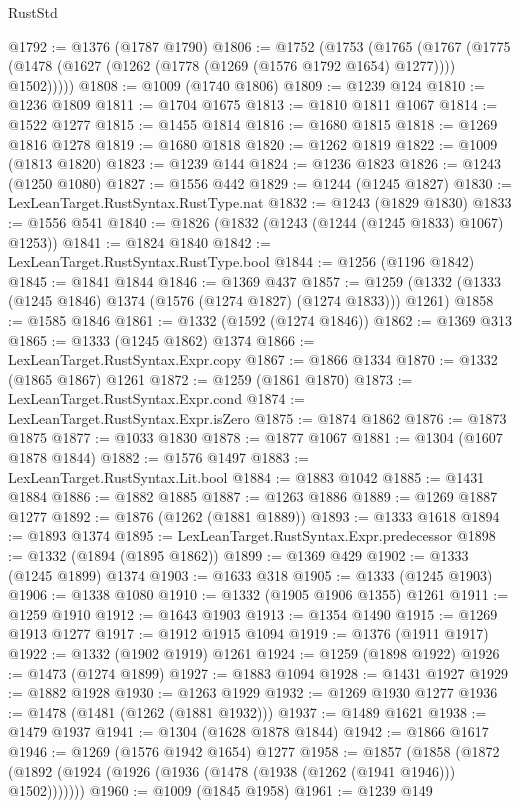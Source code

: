\begin{lexlean}{RustStd}
\begin{coremodule}
@1792 := @1376 (@1787 @1790)
@1806 := @1752
    (@1753
      (@1765
        (@1767 (@1775 (@1478 (@1627 (@1262 (@1778 (@1269 (@1576 @1792 @1654) @1277)))) @1502)))))
@1808 := @1009 (@1740 @1806)
@1809 := @1239 @124
@1810 := @1236 @1809
@1811 := @1704 @1675
@1813 := @1810 @1811 @1067
@1814 := @1522 @1277
@1815 := @1455 @1814
@1816 := @1680 @1815
@1818 := @1269 @1816 @1278
@1819 := @1680 @1818
@1820 := @1262 @1819
@1822 := @1009 (@1813 @1820)
@1823 := @1239 @144
@1824 := @1236 @1823
@1826 := @1243 (@1250 @1080)
@1827 := @1556 @442
@1829 := @1244 (@1245 @1827)
@1830 := LexLeanTarget.RustSyntax.RustType.nat
@1832 := @1243 (@1829 @1830)
@1833 := @1556 @541
@1840 := @1826 (@1832 (@1243 (@1244 (@1245 @1833) @1067) @1253))
@1841 := @1824 @1840
@1842 := LexLeanTarget.RustSyntax.RustType.bool
@1844 := @1256 (@1196 @1842)
@1845 := @1841 @1844
@1846 := @1369 @437
@1857 := @1259 (@1332 (@1333 (@1245 @1846) @1374 (@1576 (@1274 @1827) (@1274 @1833))) @1261)
@1858 := @1585 @1846
@1861 := @1332 (@1592 (@1274 @1846))
@1862 := @1369 @313
@1865 := @1333 (@1245 @1862) @1374
@1866 := LexLeanTarget.RustSyntax.Expr.copy
@1867 := @1866 @1334
@1870 := @1332 (@1865 @1867) @1261
@1872 := @1259 (@1861 @1870)
@1873 := LexLeanTarget.RustSyntax.Expr.cond
@1874 := LexLeanTarget.RustSyntax.Expr.isZero
@1875 := @1874 @1862
@1876 := @1873 @1875
@1877 := @1033 @1830
@1878 := @1877 @1067
@1881 := @1304 (@1607 @1878 @1844)
@1882 := @1576 @1497
@1883 := LexLeanTarget.RustSyntax.Lit.bool
@1884 := @1883 @1042
@1885 := @1431 @1884
@1886 := @1882 @1885
@1887 := @1263 @1886
@1889 := @1269 @1887 @1277
@1892 := @1876 (@1262 (@1881 @1889))
@1893 := @1333 @1618
@1894 := @1893 @1374
@1895 := LexLeanTarget.RustSyntax.Expr.predecessor
@1898 := @1332 (@1894 (@1895 @1862))
@1899 := @1369 @429
@1902 := @1333 (@1245 @1899) @1374
@1903 := @1633 @318
@1905 := @1333 (@1245 @1903)
@1906 := @1338 @1080
@1910 := @1332 (@1905 @1906 @1355) @1261
@1911 := @1259 @1910
@1912 := @1643 @1903
@1913 := @1354 @1490
@1915 := @1269 @1913 @1277
@1917 := @1912 @1915 @1094
@1919 := @1376 (@1911 @1917)
@1922 := @1332 (@1902 @1919) @1261
@1924 := @1259 (@1898 @1922)
@1926 := @1473 (@1274 @1899)
@1927 := @1883 @1094
@1928 := @1431 @1927
@1929 := @1882 @1928
@1930 := @1263 @1929
@1932 := @1269 @1930 @1277
@1936 := @1478 (@1481 (@1262 (@1881 @1932)))
@1937 := @1489 @1621
@1938 := @1479 @1937
@1941 := @1304 (@1628 @1878 @1844)
@1942 := @1866 @1617
@1946 := @1269 (@1576 @1942 @1654) @1277
@1958 := @1857
    (@1858 (@1872 (@1892 (@1924 (@1926 (@1936 (@1478 (@1938 (@1262 (@1941 @1946))) @1502)))))))
@1960 := @1009 (@1845 @1958)
@1961 := @1239 @149

\end{coremodule}
\end{lexlean}
